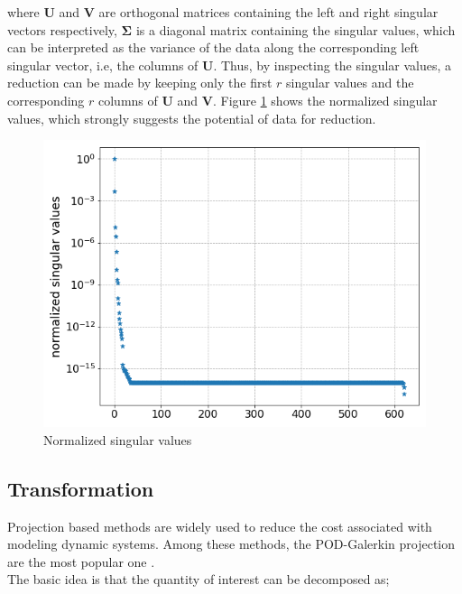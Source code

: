 \documentclass{anstrans}
\begin{document}
where $\textbf{U}$ and $\textbf{V}$ are orthogonal matrices containing the left and right singular vectors respectively, $\boldsymbol{\Sigma}$ is a diagonal matrix containing the singular values, 
which can be interpreted as the variance of the data along the corresponding left singular vector, i.e, the columns of $\textbf{U}$. 
Thus, by inspecting the singular values, a reduction can be made by keeping only the first $r$ singular values and the corresponding $r$ columns of $\textbf{U}$ and $\textbf{V}$.
Figure \ref{fig:svd} shows the normalized singular values, which strongly suggests the potential of data for reduction.
\begin{figure}[!h]
	\centering
	\includegraphics[scale=0.4]{./figs/singular_values.png}
	\caption{Normalized singular values}
	\label{fig:svd}
\end{figure}

\subsection{Transformation}
Projection based methods are widely used to reduce the cost associated with modeling dynamic systems. Among these methods, the POD-Galerkin projection are the most popular one \cite{benner2015survey} .\\
The basic idea is that the quantity of interest can be decomposed as; 
\end{document}
